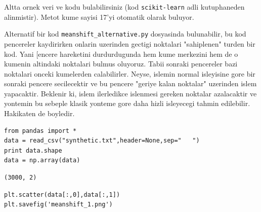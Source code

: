\documentclass[12pt,fleqn]{article}\usepackage{../common}
\begin{document}
Altta ornek veri ve kodu bulabilirsiniz (kod \verb!scikit-learn!
adli kutuphaneden alinmistir). Metot kume sayisi 17'yi otomatik olarak
buluyor.

Alternatif bir kod \verb!meanshift_alternative.py! dosyasinda
bulunabilir, bu kod pencereler kaydirirken onlarin uzerinden gectigi
noktalari "sahiplenen" turden bir kod. Yani [encere hareketini
durdurdugunda hem kume merkezini hem de o kumenin altindaki noktalari
bulmus oluyoruz.  Tabii sonraki pencereler bazi noktalari onceki
kumelerden calabilirler. Neyse, islemin normal isleyisine gore bir
sonraki pencere secilecektir ve bu pencere "geriye kalan noktalar"
uzerinden islem yapacaktir.  Beklenir ki, islem ilerledikce islenmesi
gereken noktalar azalacaktir ve yontemin bu sebeple klasik yonteme
gore daha hizli isleyecegi tahmin edilebilir. Hakikaten de boyledir.

\begin{verbatim}
from pandas import *
data = read_csv("synthetic.txt",header=None,sep="   ")
print data.shape
data = np.array(data)
\end{verbatim}

\begin{verbatim}
(3000, 2)
\end{verbatim}

\begin{verbatim}
plt.scatter(data[:,0],data[:,1])
plt.savefig('meanshift_1.png')
\end{verbatim}
\end{document}
